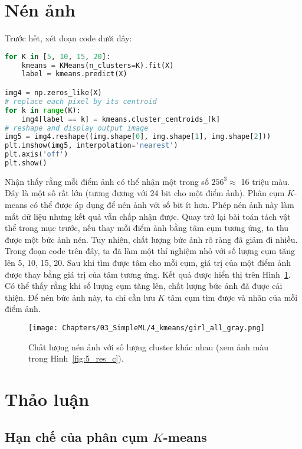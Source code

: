 \section{Nén ảnh}

Trước hết, xét đoạn code dưới đây:

\begin{lstlisting}[language=Python]
for K in [5, 10, 15, 20]:
    kmeans = KMeans(n_clusters=K).fit(X)
    label = kmeans.predict(X)

img4 = np.zeros_like(X)
# replace each pixel by its centroid
for k in range(K):
    img4[label == k] = kmeans.cluster_centroids_[k]
# reshape and display output image
img5 = img4.reshape((img.shape[0], img.shape[1], img.shape[2]))
plt.imshow(img5, interpolation='nearest')
plt.axis('off')
plt.show()
\end{lstlisting}

Nhận thấy rằng mỗi điểm ảnh có thể nhận một trong số $256^3 \approx $ 16 triệu
màu. Đây là một số rất lớn (tương đương với 24 bit cho một điểm ảnh). Phân cụm
$K$-means có thể được áp dụng để nén ảnh với số bit ít hơn. Phép nén ảnh này làm
mất dữ liệu nhưng kết quả vẫn chấp nhận được. Quay trở lại bài toán tách vật thể
trong mục trước, nếu thay mỗi điểm ảnh bằng tâm cụm tương ứng, ta thu được một
bức ảnh nén. Tuy nhiên, chất lượng bức ảnh rõ ràng đã giảm đi nhiều. Trong đoạn
code trên đây, ta đã làm một thí nghiệm nhỏ với số lượng cụm tăng lên 5, 10, 15,
20. Sau khi tìm được tâm cho mỗi cụm, giá trị của một điểm ảnh được thay bằng
giá trị của tâm tương ứng. Kết quả được hiển thị trên Hình~\ref{fig:5_res}. Có
thể thấy rằng khi số lượng cụm tăng lên, chất lượng bức ảnh đã được cải thiện.
Để nén bức ảnh này, ta chỉ cần lưu $K$ tâm cụm tìm được và nhãn của mỗi điểm
ảnh.



\begin{figure}[t]
\centering
\texttt{[image: Chapters/03\_SimpleML/4\_kmeans/girl\_all\_gray.png]}
\caption[]{Chất lượng nén ảnh với số lượng cluster khác nhau (xem ảnh màu trong Hình~\ref{fig:5_res_c}).}
\label{fig:5_res}
\end{figure}


\section{Thảo luận}
\subsection{Hạn chế của phân cụm $K$-means}


